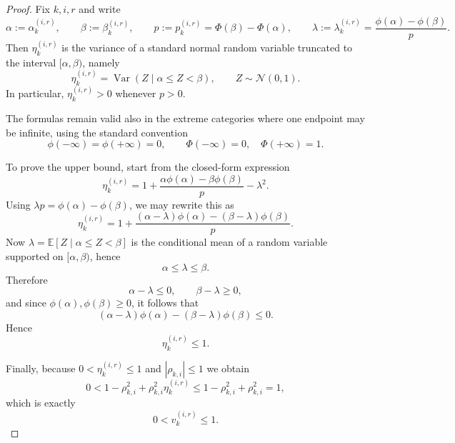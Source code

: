 \documentclass{article}
\begin{document}
\begin{proof}
Fix $k,i,r$ and write
\begin{equation*}
\alpha:=\alpha_k^{(i,r)},\qquad
\beta:=\beta_k^{(i,r)},\qquad
p:=p_k^{(i,r)}=\Phi(\beta)-\Phi(\alpha),
\qquad
\lambda:=\lambda_k^{(i,r)}=\frac{\phi(\alpha)-\phi(\beta)}{p}.
\end{equation*}
Then $\eta_k^{(i,r)}$ is the variance of a standard normal random variable truncated to the
interval $[\alpha,\beta)$, namely
\begin{equation*}
\eta_k^{(i,r)}=\operatorname{Var}(Z\mid \alpha\le Z<\beta),
\qquad Z\sim\mathcal N(0,1).
\end{equation*}
In particular, $\eta_k^{(i,r)}>0$ whenever $p>0$.

The formulas remain valid also in the extreme categories where one endpoint may be infinite,
using the standard convention
\begin{equation*}
\phi(-\infty)=\phi(+\infty)=0,
\qquad
\Phi(-\infty)=0,\quad \Phi(+\infty)=1.
\end{equation*}

To prove the upper bound, start from the closed-form expression
\begin{equation*}
\eta_k^{(i,r)}
=
1+\frac{\alpha\phi(\alpha)-\beta\phi(\beta)}{p}-\lambda^2.
\end{equation*}
Using $\lambda p=\phi(\alpha)-\phi(\beta)$, we may rewrite this as
\begin{equation*}
\eta_k^{(i,r)}
=
1+\frac{(\alpha-\lambda)\phi(\alpha)-(\beta-\lambda)\phi(\beta)}{p}.
\end{equation*}
Now $\lambda=\mathbb E[Z\mid \alpha\le Z<\beta]$ is the conditional mean of a random variable
supported on $[\alpha,\beta)$, hence
\begin{equation*}
\alpha\le \lambda\le \beta.
\end{equation*}
Therefore
\begin{equation*}
\alpha-\lambda\le 0,
\qquad
\beta-\lambda\ge 0,
\end{equation*}
and since $\phi(\alpha),\phi(\beta)\ge 0$, it follows that
\begin{equation*}
(\alpha-\lambda)\phi(\alpha)-(\beta-\lambda)\phi(\beta)\le 0.
\end{equation*}
Hence
\begin{equation*}
\eta_k^{(i,r)}\le 1.
\end{equation*}

Finally, because $0<\eta_k^{(i,r)}\le 1$ and $|\rho_{k,i}|\leq 1$ we obtain
\begin{equation*}
0<
1-\rho_{k,i}^2+\rho_{k,i}^2\eta_k^{(i,r)}
\le
1-\rho_{k,i}^2+\rho_{k,i}^2
=1,
\end{equation*}
which is exactly
\begin{equation*}
0<v_k^{(i,r)}\le 1.
\end{equation*}
\end{proof}
\newpage
\end{document}
